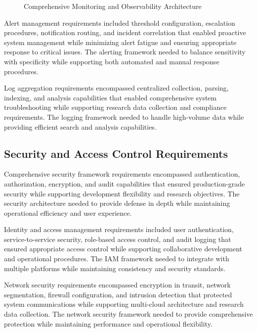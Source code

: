 \begin{figure}[H]
\centering
\caption{Comprehensive Monitoring and Observability Architecture}
\label{fig:monitoring-observability-architecture}
\end{figure}

Alert management requirements included threshold configuration, escalation procedures, notification routing, and incident correlation that enabled proactive system management while minimizing alert fatigue and ensuring appropriate response to critical issues. The alerting framework needed to balance sensitivity with specificity while supporting both automated and manual response procedures.

Log aggregation requirements encompassed centralized collection, parsing, indexing, and analysis capabilities that enabled comprehensive system troubleshooting while supporting research data collection and compliance requirements. The logging framework needed to handle high-volume data while providing efficient search and analysis capabilities.

\subsection{Security and Access Control Requirements}

Comprehensive security framework requirements encompassed authentication, authorization, encryption, and audit capabilities that ensured production-grade security while supporting development flexibility and research objectives. The security architecture needed to provide defense in depth while maintaining operational efficiency and user experience.

Identity and access management requirements included user authentication, service-to-service security, role-based access control, and audit logging that ensured appropriate access control while supporting collaborative development and operational procedures. The IAM framework needed to integrate with multiple platforms while maintaining consistency and security standards.

Network security requirements encompassed encryption in transit, network segmentation, firewall configuration, and intrusion detection that protected system communications while supporting multi-cloud architecture and research data collection. The network security framework needed to provide comprehensive protection while maintaining performance and operational flexibility.

